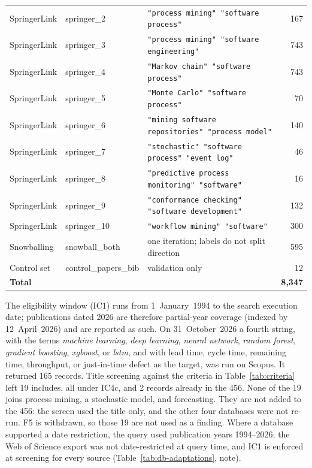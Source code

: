 \begin{table}[htbp]
\begin{tabular}{llp{5.9cm}r}
SpringerLink & springer\_2 & \texttt{"process mining" "software process"} & 167 \\
SpringerLink & springer\_3 & \texttt{"process mining" "software engineering"} & 743 \\
SpringerLink & springer\_4 & \texttt{"Markov chain" "software process"} & 743 \\
SpringerLink & springer\_5 & \texttt{"Monte Carlo" "software process"} & 70 \\
SpringerLink & springer\_6 & \texttt{"mining software repositories" "process model"} & 140 \\
SpringerLink & springer\_7 & \texttt{"stochastic" "software process" "event log"} & 46 \\
SpringerLink & springer\_8 & \texttt{"predictive process monitoring" "software"} & 16 \\
SpringerLink & springer\_9 & \texttt{"conformance checking" "software development"} & 132 \\
SpringerLink & springer\_10 & \texttt{"workflow mining" "software"} & 300 \\
\midrule
Snowballing & snowball\_both & one iteration; labels do not split direction & 595 \\
Control set & control\_papers\_bib & validation only & 12 \\
\midrule
\textbf{Total} & & & \textbf{8{,}347} \\
\bottomrule
\end{tabular}
\end{table}

The eligibility window (IC1) runs from
1~January~1994 to the search execution date; publications dated 2026 are
therefore partial-year coverage (indexed by 12~April~2026) and are reported
as such. On 31~October~2026 a fourth string, with the terms
\emph{machine learning}, \emph{deep learning}, \emph{neural network},
\emph{random forest}, \emph{gradient boosting}, \emph{xgboost}, or
\emph{lstm}, and with lead time, cycle time, remaining time, throughput,
or just-in-time defect as the target, was run on Scopus. It returned 165
records. Title screening against the criteria in
Table~\ref{tab:criteria} left 19 includes, all under IC4c, and 2 records
already in the 456. None of the 19 joins process mining, a stochastic
model, and forecasting. They are not added to the 456: the screen used the
title only, and the other four databases were not re-run. F5 is
withdrawn, so those 19 are not used as a finding. Where a database supported a date restriction, the query used
publication years 1994--2026; the Web of Science export was not
date-restricted at query time, and IC1 is enforced at screening for every
source (Table~\ref{tab:db-adaptations}, note).

